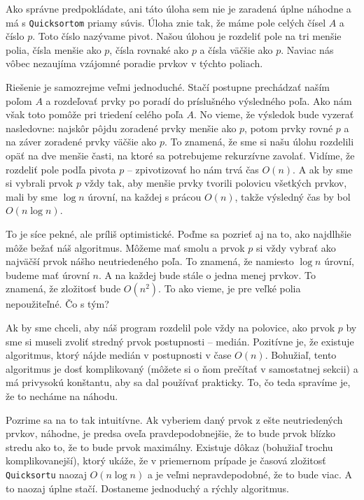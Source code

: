 
Ako správne predpokládate, ani táto úloha sem nie je zaradená úplne náhodne a má s
\texttt{Quicksortom} priamy súvis. Úloha znie tak, že máme pole celých čísel $A$ a číslo $p$. Toto
číslo nazývame pivot. Našou úlohou je rozdeliť pole na tri menšie polia, čísla menšie ako $p$, čísla
rovnaké ako $p$ a čísla väčšie ako $p$. Naviac nás vôbec nezaujíma vzájomné poradie prvkov v týchto
poliach.

Riešenie je samozrejme veľmi jednoduché. Stačí postupne prechádzať naším poľom $A$ a rozdeľovať
prvky po poradí do príslušného výsledného poľa. Ako nám však toto pomôže pri triedení celého poľa
$A$. No vieme, že výsledok bude vyzerať nasledovne: najskôr pôjdu zoradené prvky menšie ako $p$,
potom prvky rovné $p$ a na záver zoradené prvky väčšie ako $p$. To znamená, že sme si našu úlohu
rozdelili opäť na dve menšie časti, na ktoré sa potrebujeme rekurzívne zavolať. Vidíme, že rozdeliť
pole podľa pivota $p$ -- zpivotizovať ho nám trvá čas $O(n)$. A ak by sme si vybrali prvok $p$ vždy
tak, aby menšie prvky tvorili polovicu všetkých prvkov, mali by sme $\log n$ úrovní, na každej s
prácou $O(n)$, takže výsledný čas by bol $O(n \log n)$.

To je síce pekné, ale príliš optimistické. Poďme sa pozrieť aj na to, ako najdlhšie môže bežať náš
algoritmus. Môžeme mať smolu a prvok $p$ si vždy vybrať ako najväčší prvok nášho neutriedeného poľa.
To znamená, že namiesto $\log n$ úrovní, budeme mať úrovní $n$. A na každej bude stále o jedna menej
prvkov. To znamená, že zložitosť bude $O(n^2)$. To ako vieme, je pre veľké polia nepoužiteľné. Čo s
tým?

Ak by sme chceli, aby náš program rozdelil pole vždy na polovice, ako prvok $p$ by sme si museli
zvoliť stredný prvok postupnosti -- medián. Pozitívne je, že existuje algoritmus, ktorý nájde medián v
postupnosti v čase $O(n)$. Bohužiaľ, tento algoritmus je dosť komplikovaný (môžete si o ňom prečítať
v samostatnej sekcii) a má privysokú konštantu, aby sa dal používať prakticky. To, čo teda spravíme
je, že to necháme na náhodu.

Pozrime sa na to tak intuitívne. Ak vyberiem daný prvok z ešte neutriedených prvkov, náhodne, je
predsa oveľa pravdepodobnejšie, že to bude prvok blízko stredu ako to, že to bude prvok maximálny.
Existuje dôkaz (bohužiaľ trochu komplikovanejší), ktorý ukáže, že v priemernom prípade je časová
zložitosť \texttt{Quicksortu} naozaj $O(n \log n)$ a je veľmi nepravdepodobné, že to bude viac. A to
naozaj úplne stačí. Dostaneme jednoduchý a rýchly algoritmus.

